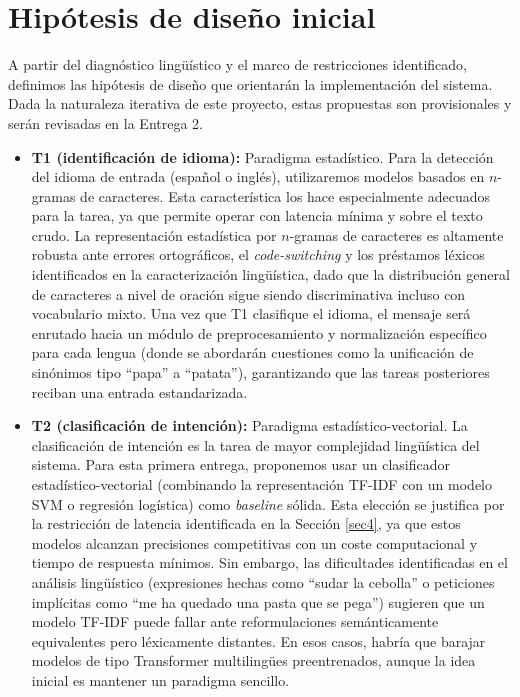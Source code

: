 \documentclass[11pt,a4paper,twoside]{article}
\theoremstyle{definition}
\numberwithin{equation}{section}
\begin{document}
\section{Hipótesis de diseño inicial}
A partir del diagnóstico lingüístico y el marco de restricciones identificado, definimos las hipótesis de diseño que orientarán la implementación del sistema. Dada la naturaleza iterativa de este proyecto, estas propuestas son provisionales y serán revisadas en la Entrega 2.
\begin{itemize}
	\item \textbf{T1 (identificación de idioma):} Paradigma estadístico. Para la detección del idioma de entrada (español o inglés), utilizaremos modelos basados en $n$-gramas de caracteres. Esta característica los hace especialmente adecuados para la tarea, ya que permite operar con latencia mínima y sobre el texto crudo. La representación estadística por $n$-gramas de caracteres es altamente robusta ante errores ortográficos, el \textit{code-switching} y los préstamos léxicos identificados en la caracterización lingüística, dado que la distribución general de caracteres a nivel de oración sigue siendo discriminativa incluso con vocabulario mixto. Una vez que T1 clasifique el idioma, el mensaje será enrutado hacia un módulo de preprocesamiento y normalización específico para cada lengua (donde se abordarán cuestiones como la unificación de sinónimos tipo ``papa'' a ``patata''), garantizando que las tareas posteriores reciban una entrada estandarizada.
	
	\item \textbf{T2 (clasificación de intención):} Paradigma estadístico-vectorial. La clasificación de intención es la tarea de mayor complejidad lingüística del sistema. Para esta primera entrega, proponemos usar un clasificador estadístico-vectorial (combinando la representación TF-IDF con un modelo SVM o regresión logística) como \textit{baseline} sólida. Esta elección se justifica por la restricción de latencia identificada en la Sección \ref{sec4}, ya que estos modelos alcanzan precisiones competitivas con un coste computacional y tiempo de respuesta mínimos. Sin embargo, las dificultades identificadas en el análisis lingüístico (expresiones hechas como ``sudar la cebolla'' o peticiones implícitas como ``me ha quedado una pasta que se pega'') sugieren que un modelo TF-IDF puede fallar ante reformulaciones semánticamente equivalentes pero léxicamente distantes. En esos casos, habría que barajar modelos de tipo Transformer multilingües preentrenados, aunque la idea inicial es mantener un paradigma sencillo.
	

\end{itemize}
\end{document}
